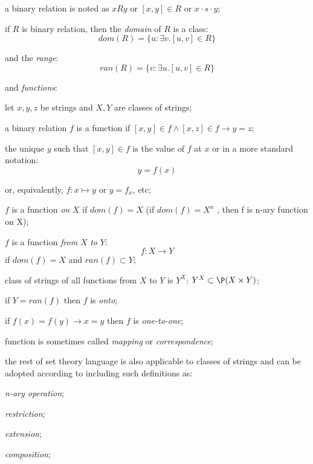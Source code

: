 \begin{definition}
\begin{legal}
\begin{legal}
\begin{legal}
        \item a binary relation is noted as $x R y$ or $[x,y] \in R$ or $x \cdot s \cdot y$;
        \item if $R$ is binary relation, then the \textit{domain} of $R$ is a class:
          \[dom(R) = \{u : \exists v.[u,v] \in R \} \]
        \item and the \textit{range}:
          \[ran(R) = \{v : \exists u.[u,v] \in R \} \]
      \end{legal}
      \item and \textit{functions}:
      \begin{legal}
        \item let $x, y, z$ be strings and $X, Y$ are classes of strings;
        \item a binary relation $f$ is a function if $[x,y] \in f \land [x,z] \in f \rightarrow y = z$;
        \item the unique $y$ such that $[x,y] \in f$ is the value of $f$ at $x$ or in a more standard notation:
          \[ y = f(x) \]
        \item or, equivalently, $f : x \mapsto y$ or $y = f_x$, etc;
        \item $f$ is a function \textit{on} $X$ if $dom(f) = X$ (if $dom(f) = X^n$ , then f is n-ary function on X);
        \item $f$ is a function \textit{from} $X$ \textit{to} $Y$:
          \[ f : X \to Y \]
          if $dom(f) = X$ and $ran(f) \subset Y$;
        \item class of strings of all functions from $X$ to $Y$ is $Y^X$: $Y^X \subset \P(X \times Y)$;
        \item if $Y = ran(f)$ then $f$ is \textit{onto};
        \item if $f(x) = f(y) \rightarrow x = y$ then $f$ is \textit{one-to-one};
        \item function is sometimes called \textit{mapping} or \textit{correspondence};
        \item the rest of set theory language is also applicable to classes of strings and can be adopted according to \cite{jech2003set} including such definitions as: 
          \begin{legal}
            \item \textit{n-ary operation};
            \item \textit{restriction};
            \item \textit{extension};
            \item \textit{composition};

\end{legal}
\end{legal}
\end{legal}
\end{legal}
\end{definition}
